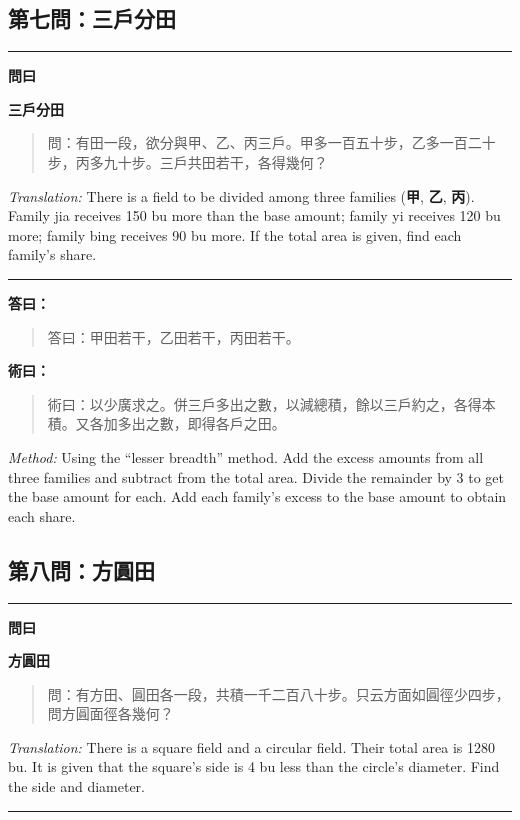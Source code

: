 \documentclass[11pt,a4paper]{article}
\newenvironment{problem}[1][]{%
  \medskip\noindent\rule{\textwidth}{0.4pt}%
  \par\noindent\textbf{\color{sectioncolor}#1}\par\nopagebreak%
  \smallskip%
}{%
  \par\noindent\rule{\textwidth}{0.4pt}\medskip%
}
\newenvironment{answer}{%
  \medskip\noindent{\color{answercolor}\rule{0.5\textwidth}{0.5pt}}%
  \par\color{answercolor}%
}{%
  \par\medskip%
}
\newenvironment{method}{%
  \medskip\noindent{\color{methodcolor}\rule{0.5\textwidth}{0.5pt}}%
  \par\color{methodcolor}%
}{%
  \par\medskip%
}
\begin{document}
\subsection*{第七問：三戶分田}

\begin{problem}[\textbf{問曰}]
\textbf{\color{sectioncolor}三戶分田}

\begin{quote}
\textcolor{chinacolor}{%
問：有田一段，欲分與甲、乙、丙三戶。甲多一百五十步，乙多一百二十步，丙多九十步。三戶共田若干，各得幾何？
}
\end{quote}

\textit{Translation:} There is a field to be divided among three families 
(\textbf{甲}, \textbf{乙}, \textbf{丙}). Family jia receives 150 bu more than the base amount; 
family yi receives 120 bu more; family bing receives 90 bu more. If the 
total area is given, find each family's share.
\end{problem}

\begin{answer}
\textbf{答曰：}

\begin{quote}
\textcolor{chinacolor}{%
答曰：甲田若干，乙田若干，丙田若干。
}
\end{quote}
\end{answer}

\begin{method}
\textbf{術曰：}

\begin{quote}
\textcolor{chinacolor}{%
術曰：以少廣求之。併三戶多出之數，以減總積，餘以三戶約之，各得本積。又各加多出之數，即得各戶之田。
}
\end{quote}

\textit{Method:} Using the ``lesser breadth'' method. Add the excess amounts 
from all three families and subtract from the total area. Divide the 
remainder by 3 to get the base amount for each. Add each family's excess 
to the base amount to obtain each share.
\end{method}

\subsection*{第八問：方圓田}

\begin{problem}[\textbf{問曰}]
\textbf{\color{sectioncolor}方圓田}

\begin{quote}
\textcolor{chinacolor}{%
問：有方田、圓田各一段，共積一千二百八十步。只云方面如圓徑少四步，問方圓面徑各幾何？
}
\end{quote}

\textit{Translation:} There is a square field and a circular field. Their 
total area is 1280 bu. It is given that the square's side is 4 bu less 
than the circle's diameter. Find the side and diameter.
\end{problem}
\end{document}
